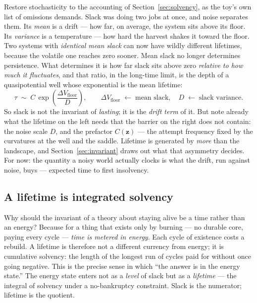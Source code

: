 \documentclass[11pt]{article}
\theoremstyle{plain}
\theoremstyle{definition}
\begin{document}
Restore stochasticity to the accounting of Section~\ref{sec:solvency}, as the toy's own list of omissions demands. Slack was doing two jobs at once, and noise separates them. Its \emph{mean} is a drift --- how far, on average, the system sits above its floor. Its \emph{variance} is a temperature --- how hard the harvest shakes it toward the floor. Two systems with \emph{identical mean slack} can now have wildly different lifetimes, because the volatile one reaches zero sooner. Mean slack no longer determines persistence. What determines it is how far slack sits above zero \emph{relative to how much it fluctuates}, and that ratio, in the long-time limit, is the depth of a quasipotential well whose exponential is the mean lifetime:
\begin{equation}
\tau \;\sim\; C\,\exp\!\left(\frac{\Delta V_{\text{floor}}}{D}\right), \qquad
\Delta V_{\text{floor}} \;\longleftarrow\; \text{mean slack}, \quad
D \;\longleftarrow\; \text{slack variance.}
\label{eq:kramers}
\end{equation}
So slack is not the invariant of \emph{lasting}; it is the \emph{drift term} of it. But note already what the lifetime on the left needs that the barrier on the right does not contain: the noise scale $D$, and the prefactor $C(\mathbf z)$ --- the attempt frequency fixed by the curvatures at the well and the saddle. Lifetime is generated by \emph{more} than the landscape, and Section~\ref{sec:invariant} draws out what that asymmetry decides. For now: the quantity a noisy world actually clocks is what the drift, run against noise, buys --- expected time to first insolvency.

\subsection{A lifetime is integrated solvency}

Why should the invariant of a theory about staying alive be a time rather than an energy? Because for a thing that exists only by burning --- no durable core, paying every cycle --- \emph{time is metered in energy}. Each cycle of existence costs a rebuild. A lifetime is therefore not a different currency from energy; it is cumulative solvency: the length of the longest run of cycles paid for without once going negative. This is the precise sense in which ``the answer is in the energy state.'' The energy state enters not as a \emph{level} of slack but as a \emph{lifetime} --- the integral of solvency under a no-bankruptcy constraint. Slack is the numerator; lifetime is the quotient.
\end{document}

